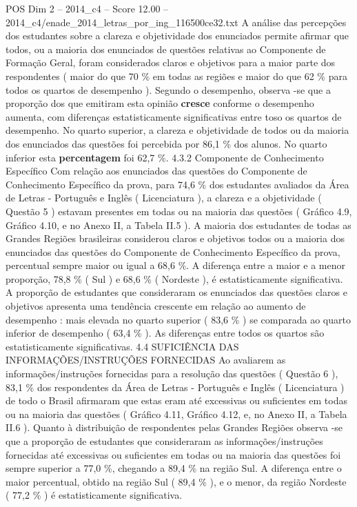 \begin{textsample}{POS Dim 2 – 2014\_c4 – Score 12.00 – 2014\_c4/enade\_2014\_letras\_por\_ing\_116500ce32.txt}
A análise das percepções dos estudantes sobre a clareza e objetividade dos enunciados permite afirmar que todos, ou a maioria dos enunciados de questões relativas ao Componente de Formação Geral, foram considerados claros e objetivos para a maior parte dos respondentes ( maior do que 70 \% em todas as regiões e maior do que 62 \% para todos os quartos de desempenho ).
Segundo o desempenho, observa -se que a proporção dos que emitiram esta opinião \textbf{cresce} conforme o desempenho aumenta, com diferenças estatisticamente significativas entre toso os quartos de desempenho.
No quarto superior, a clareza e objetividade de todos ou da maioria dos enunciados das questões foi percebida por 86,1 \% dos alunos.
No quarto inferior esta \textbf{percentagem} foi 62,7 \%. 4.3.2 Componente de Conhecimento Específico Com relação aos enunciados das questões do Componente de Conhecimento Específico da prova, para 74,6 \% dos estudantes avaliados da Área de Letras - Português e Inglês ( Licenciatura ), a clareza e a objetividade ( Questão 5 ) estavam presentes em todas ou na maioria das questões ( Gráfico 4.9, Gráfico 4.10, e no Anexo II, a Tabela II.5 ).
A maioria dos estudantes de todas as Grandes Regiões brasileiras considerou claros e objetivos todos ou a maioria dos enunciados das questões do Componente de Conhecimento Específico da prova, percentual sempre maior ou igual a 68,6 \%.
A diferença entre a maior e a menor proporção, 78,8 \% ( Sul ) e 68,6 \% ( Nordeste ), é estatisticamente significativa.
A proporção de estudantes que consideraram os enunciados das questões claros e objetivos apresenta uma tendência crescente em relação ao aumento de desempenho : mais elevada no quarto superior ( 83,6 \% ) se comparada ao quarto inferior de desempenho ( 63,4 \% ).
As diferenças entre todos os quartos são estatisticamente significativas. 4.4 SUFICIÊNCIA DAS INFORMAÇÕES/INSTRUÇÕES FORNECIDAS Ao avaliarem as informações/instruções fornecidas para a resolução das questões ( Questão 6 ), 83,1 \% dos respondentes da Área de Letras - Português e Inglês ( Licenciatura ) de todo o Brasil afirmaram que estas eram até excessivas ou suficientes em todas ou na maioria das questões ( Gráfico 4.11, Gráfico 4.12, e, no Anexo II, a Tabela II.6 ).
Quanto à distribuição de respondentes pelas Grandes Regiões observa -se que a proporção de estudantes que consideraram as informações/instruções fornecidas até excessivas ou suficientes em todas ou na maioria das questões foi sempre superior a 77,0 \%, chegando a 89,4 \% na região Sul.
A diferença entre o maior percentual, obtido na região Sul ( 89,4 \% ), e o menor, da região Nordeste ( 77,2 \% ) é estatisticamente significativa.

\end{textsample}
